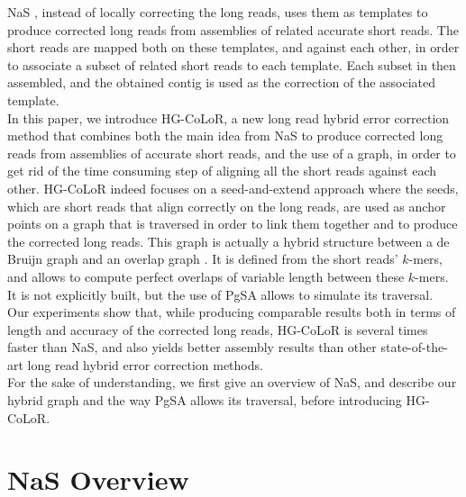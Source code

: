 \documentclass[long, final]{jobim2017}
\begin{document}
\indent NaS \cite{Madoui2015}, instead of locally correcting the long reads, uses them as templates to produce corrected long reads from assemblies of related accurate short reads. The short reads are mapped both on these templates, and against each other, in order to associate a subset of related short reads to each template. Each subset in then assembled, and the obtained contig is used as the correction of the associated template. \\
\indent In this paper, we introduce HG-CoLoR, a new long read hybrid error correction method that combines both the main idea from NaS to produce corrected long reads from assemblies of accurate short reads, and the use of a graph, in order to get rid of the time consuming step of aligning all the short reads against each other. HG-CoLoR indeed focuses on a seed-and-extend approach where the seeds, which are short reads that align correctly on the long reads, are used as anchor points on a graph that is traversed in order to link them together and to produce the corrected long reads. This graph is actually a hybrid structure between a de Bruijn graph and an overlap graph \cite{Ehrenfecht2004}. It is defined from the short reads' $k$-mers, and allows to compute perfect overlaps of variable length between these $k$-mers. It is not explicitly built, but the use of PgSA \cite{Kowalski2015} allows to simulate its traversal. \\
\indent Our experiments show that, while producing comparable results both in terms of length and accuracy of the corrected long reads, HG-CoLoR is several times faster than NaS, and also yields better assembly results than other state-of-the-art long read hybrid error correction methods. \\
\indent For the sake of understanding, we first give an overview of NaS, and describe our hybrid graph and the way PgSA allows its traversal, before introducing HG-CoLoR.

\section{NaS Overview}
\label{sec:NaSO}
\end{document}
